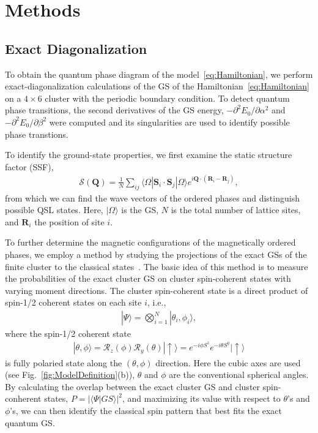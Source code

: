 \documentclass[aps,prb,reprint,amsfonts,amsmath,amssymb,showpacs,groupedaddress,superscriptaddress]{revtex4-1}
\begin{document}
\section{\label{sec:Methods}Methods}

\subsection{\label{subsec:MethodED}Exact Diagonalization}

To obtain the quantum phase diagram of the model~\eqref{eq:Hamiltonian}, we perform exact-diagonalization calculations of the GS of the Hamiltonian~\eqref{eq:Hamiltonian} on a $4 \times 6$ cluster with the periodic boundary condition. To detect quantum phase transitions, the second derivatives of the GS energy, $-\partial^2E_0/\partial\alpha^2$ and $-\partial^2E_0/\partial\beta^2$ were computed and its singularities are used to identify possible phase transtions.

To identify the ground-state properties, we first examine the static structure factor (SSF),
\begin{align}
    \mathcal{S}(\bm{Q}) = \frac{1}{N} \sum_{ij} \langle \Omega | \bm{S}_i \cdot \bm{S}_j | \Omega \rangle e^{i \bm{Q} \cdot (\bm{R}_i - \bm{R}_j)},
    \label{eq:SSF}
\end{align}
from which we can find the wave vectors of the ordered phases and distinguish possible QSL states. Here, $|\Omega\rangle$ is the GS, $N$ is the total number of lattice sites, and $\bm{R}_i$ the position of site $i$.

To further determine the magnetic configurations of the magnetically ordered phases, we employ a method by studying the projections of the exact GSs of the finite cluster to the classical states~\cite{PhysRevB.94.064435}. The basic idea of this method is to measure the probabilities of the exact cluster GS on cluster spin-coherent states with varying moment directions. The cluster spin-coherent state is a direct product of spin-1/2 coherent states on each site $i$, i.e.,
\begin{align}
    |\Psi \rangle = \bigotimes_{i=1}^N | \theta_i, \phi_i \rangle,
    \label{eq:ClusterCoherentState}
\end{align}
where the spin-1/2 coherent state
\begin{align}
    |\theta, \phi\rangle = \mathcal{R}_z(\phi) \mathcal{R}_y(\theta) | \uparrow \rangle = e^{-i \phi S^z} e^{-i \theta S^y} | \uparrow \rangle
    \label{eq:Spin-1/2CoherentState}
\end{align}
is fully polaried state along the $(\theta, \phi)$ direction. Here the cubic axes are used (see Fig.~\ref{fig:ModelDefinition}(b)), $\theta$ and $\phi$ are the conventional spherical angles. By calculating the overlap between the exact cluster GS and cluster spin-conherent states, $P = | \langle \Psi | GS \rangle|^2$, and maximizing its value with respect to $\theta$'s and $\phi$'s, we can then identify the classical spin pattern that best fits the exact quantum GS.
\end{document}
